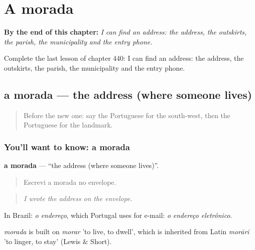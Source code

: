 
\chapter{A morada}
\label{ch:pt-a-morada}

\begin{chapteropening}
\textbf{By the end of this chapter:} \emph{I can find an address: the address, the outskirts, the parish, the municipality and the entry phone.}

Complete the last lesson of chapter 440: I can find an address: the address, the outskirts, the parish, the municipality and the entry phone.
\end{chapteropening}

\section[a morada]{a morada — the address (where someone lives)}

\label{lesson:PT-C440-morada}



\begin{quote}
Before the new one: say the Portuguese for the south-west, then the Portuguese for the landmark.
\end{quote}

\subsection*{You'll want to know: a morada}
\textbf{a morada} — \textquotedblleft{}the address (where someone lives)\textquotedblright{}.

\begin{quote}
Escrevi a morada no envelope.
\end{quote}

\begin{quote}
\emph{I wrote the address on the envelope.}
\end{quote}

In Brazil: \emph{o endereço}, which Portugal uses for e-mail: \emph{o endereço eletrónico}.

\begin{cousinweb}
\emph{morada} is built on \emph{morar} 'to live, to dwell', which is inherited from Latin \emph{morārī} 'to linger, to stay' (Lewis \& Short).
\end{cousinweb}


